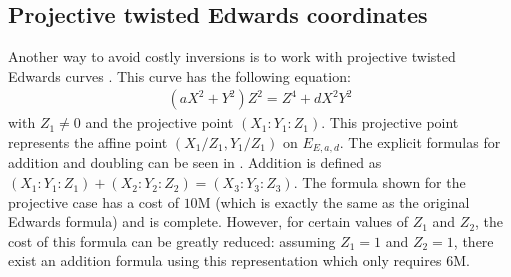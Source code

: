 \subsection{Projective twisted Edwards coordinates}
Another way to avoid costly inversions is to work with projective twisted Edwards curves \cite{bern2008twisted}.
This curve has the following equation:
%
\begin{align*}
	(aX^2 + Y^2) Z^2 = Z^4 + dX^2Y^2
\end{align*}
%
with $Z_1 \neq 0$ and the projective point $(X_1 : Y_1 : Z_1)$.
This projective point represents the affine point $(X_1 / Z_1, Y_1 / Z_1)$ on  $E_{E, a, d}$.  The explicit formulas for addition and doubling can be seen in .
Addition is defined as $(X_1 : Y_1 : Z_1) + (X_2 : Y_2 : Z_2) = (X_3 : Y_3 :  Z_3)$. The formula shown  for the projective case has a cost of $10\bm{\mathrm{M}}$ (which is exactly the same as the original Edwards formula) and is complete.
However, for certain values of $Z_1$ and $Z_2$, the cost of this formula can be greatly reduced: assuming $Z_1 = 1$ and $Z_2 = 1$, there exist an addition formula using this representation which only requires $6\bm{\mathrm{M}}$.
%
